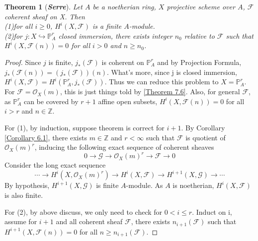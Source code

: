 \documentclass{ctexart}
\newtheorem{theorem}{Theorem}[section]
\begin{document}
\begin{theorem}[\textbf{\emph{Serre}}]
    Let $A$ be a noetherian ring, $X$ projective scheme over $A$, $\mathcal{F}$ coherent sheaf on X.
    Then \\
    (1)for all $i \ge 0$, $H^{i}(X, \mathcal{F})$ is a finite $A$-module. \\
    (2)for $j: X \hookrightarrow \mathbb{P}_{A}^{r}$ closed immersion, there exists integer $n_{0}$ relative to $\mathcal{F}$ such that $H^{i}(X, \mathcal{F}(n)) = 0$ for all $i > 0$ and $n \ge n_{0}$.
    \label{Theorem 7.7}
\end{theorem}
\begin{proof}
    Since $j$ is finite, $j_{\ast}(\mathcal{F})$ is coherent on $\mathbb{P}_{A}^{r}$ and by Projection Formula, $j_{\ast}(\mathcal{F}(n)) = (j_{\ast}(\mathcal{F}))(n)$.
    What's more, since j is closed immersion, $H^{i}(X, \mathcal{F}) = H^{i}(\mathbb{P}_{A}^{r}, j_{\ast}(\mathcal{F}))$.
    Thus we can reduce this problem to $X = \mathbb{P}_{A}^{r}$.
    For $\mathcal{F} = \mathcal{O}_{X}(m)$, this is just things told by \ref{Theorem 7.6}.
    Also, for general $\mathcal{F}$, as $\mathbb{P}_{A}^{r}$ can be covered by $r + 1$ affine open subsets, 
    $H^{i}(X, \mathcal{F}(n)) = 0$ for all $i > r$ and $n\in \mathbb{Z}$.
    \par
    For (1), by induction, suppose theorem is correct for $i + 1$.
    By Corollary \ref{Corollary 6.1}, there exists $m\in \mathbb{Z}$ and $r < \infty$ such that $\mathcal{F}$ is quotient of $\mathcal{O}_{X}(m)^{r}$,
    inducing the following exact sequence of coherent sheaves
    \begin{equation*}
        0 \longrightarrow \mathcal{G} \longrightarrow \mathcal{O}_{X}(m)^{r} \longrightarrow \mathcal{F} \longrightarrow 0
    \end{equation*} 
    Consider the long exact sequence
    \begin{equation*}
        \cdots \longrightarrow H^{i}(X, \mathcal{O}_{X}(m)^{r}) \longrightarrow H^{i}(X, \mathcal{F}) \longrightarrow H^{i + 1}(X, \mathcal{G}) \longrightarrow \cdots
    \end{equation*}
    By hypothesis, $H^{i + 1}(X, \mathcal{G})$ is finite $A$-module.
    As $A$ is noetherian, $H^{i}(X, \mathcal{F})$ is also finite.
    \par
    For (2), by above discuss, we only need to check for $0 < i \le r$.
    Induct on i, assume for $i + 1$ and all coherent sheaf $\mathcal{F}$,
    there exists $n_{i + 1}(\mathcal{F})$ such that $H^{i + 1}(X, \mathcal{F}(n)) = 0$ for all $n \ge n_{i + 1}(\mathcal{F})$.

\end{proof}
\end{document}
